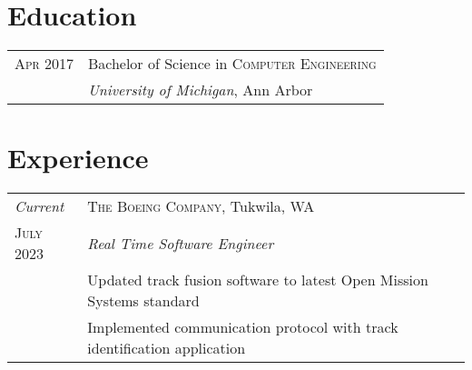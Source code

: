 \documentclass[a4paper,12pt]{article} %
\begin{document}
\pagestyle{empty} %


\par{\par}
\par{\par}

\vspace{10pt} %


\section{Education}

\begin{tabular}{R{2.1cm}|L{13.0cm}}
\textsc{Apr 2017} & Bachelor of Science in \textsc{Computer Engineering} \\
& \normalsize\emph{University of Michigan}, Ann Arbor \\
\end{tabular}


\section{Experience}

\begin{tabular}{R{2.1cm}|L{13.0cm}}
\emph{Current} & \textsc{The Boeing Company}, Tukwila, WA \\
\textsc{July 2023} & \emph{Real Time Software Engineer} \\
& \footnotesize{Updated track fusion software to latest Open Mission Systems standard} \\
& \footnotesize{Implemented communication protocol with track identification application} \\

\end{tabular}
\end{document}
